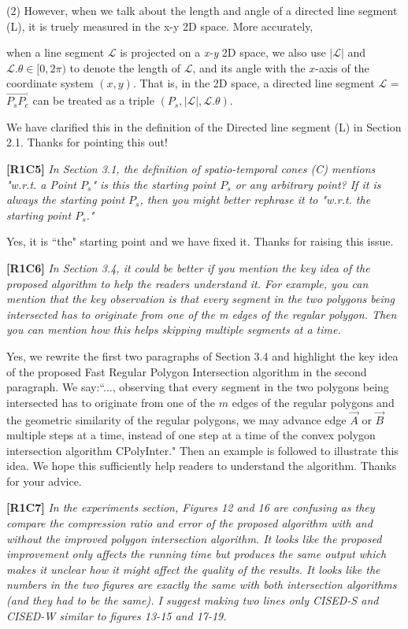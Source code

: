 \documentclass{letter}
\newcommand{\vv}{\overrightarrow}
\begin{document}
(2) However, when we talk about the length and angle of a directed line segment (L), it is truely measured in the x-y 2D space. More accurately, {when a line segment $\mathcal{L}$ is projected on a \emph{x-y} 2D space, we also use $|\mathcal{L}|$ and $\mathcal{L}.\theta\in [0, 2\pi)$ to denote the length of $\mathcal{L}$, and its angle with the $x$-axis of the coordinate system $(x, y)$.  That is, in the 2D space, a directed line segment $\mathcal{L}$ = $\vv{P_{s}P_{e}}$ can be treated as a triple $(P_s, |\mathcal{L}|, \mathcal{L}.\theta)$.

We have clarified this in the definition of the Directed line segment (L) in Section 2.1. Thanks for pointing this out!


\textbf{[R1C5]} \emph{In Section 3.1, the definition of spatio-temporal cones (C) mentions "w.r.t. a Point $P_s$" is this the starting point $P_s$ or any arbitrary point? If it is always the starting point $P_s$, then you might better rephrase it to "w.r.t. the starting point $P_s$."}

Yes, it is ``the" starting point and we have fixed it. Thanks for raising this issue.

\textbf{[R1C6]} \emph{In Section 3.4, it could be better if you mention the key idea of the proposed algorithm to help the readers understand it. For example, you can mention that the key observation is that every segment in the two polygons being intersected has to originate from one of the m edges of the regular polygon. Then you can mention how this helps skipping multiple segments at a time.}

Yes, we rewrite the first two paragraphs of Section 3.4 and highlight the key idea of the proposed Fast Regular Polygon Intersection algorithm in the second paragraph.
{We say:``..., observing that every segment in the two polygons being intersected has to originate from one of the $m$ edges of the regular polygons and the geometric similarity of the regular polygons,
we may advance edge $\vv{A}$ or $\vv{B}$ multiple steps at a time, instead of one step at a time of the convex polygon intersection algorithm CPolyInter."} Then an example is followed to illustrate this idea.
We hope this sufficiently help readers to understand the algorithm. Thanks for your advice.



\textbf{[R1C7]} \emph{In the experiments section, Figures 12 and 16 are confusing as they compare the compression ratio and error of the proposed algorithm with and without the improved polygon intersection algorithm. It looks like the proposed improvement only affects the running time but produces the same output which makes it unclear how it might affect the quality of the results. It looks like the numbers in the two figures are exactly the same with both intersection algorithms (and they had to be the same). I suggest making two lines only CISED-S and CISED-W similar to figures 13-15 and 17-19.}

}
\end{document}
